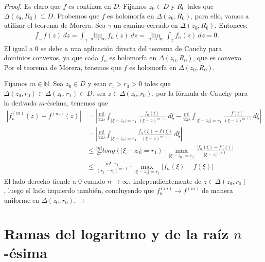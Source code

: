 \begin{proof}
    Es claro que $f$ es continua en $D$. Fijamos $z_0 \in D$ y $R_0$ tales que $\Delta(z_0,R_0) \subset D$. Probemos que $f$ es holomorfa en $\Delta(z_0,R_0)$, para ello, vamos a utilizar el teorema de Morera. Sea $\gamma$ un camino cerrado en $\Delta(z_0,R_0)$. Entonces:
    \begin{align*}
        \int_{\gamma} f(z) \ dz = \int_{\gamma} \lim_{n \to \infty} f_n(z) \ dz = \lim_{n \to \infty} \int_{\gamma} f_n(z) \ dz = 0.
    \end{align*}
    El igual a 0 se debe a una aplicación directa del teorema de Cauchy para dominios convexos, ya que cada $f_n$ es holomorfa en $\Delta(z_0,R_0)$, que es convexo. Por el teorema de Morera, tenemos que $f$ es holomorfa en $\Delta(z_0,R_0)$.

    Fijamos $m \in \mathbb{N}$. Sea $z_0 \in D$ y sean $r_1 > r_0 > 0$ tales que
    $\overline{\Delta(z_0,r_0)} \subset \overline{\Delta(z_0,r_1)} \subset D$. sea $z \in \Delta(z_0,r_0)$, por la fórmula de Cauchy para la derivada $m$-éseima, tenemos que
    \begin{align*}
        \left| f_n^{(m)}(z) - f^{(m)}(z) \right| & = \left| \frac{m!}{2\pi i}  \int_{|\xi - z_0| = r_1} \frac{f_n(\xi)}{(\xi - z)^{m+1}} \ d\xi - \frac{m!}{2\pi i} \int_{|\xi - z_0| = r_1} \frac{f(\xi)}{(\xi - z)^{m+1}} \ d\xi \right| \\
                                                 & = \left| \frac{m!}{2\pi i} \int_{|\xi - z_0| = r_1} \frac{f_n(\xi) - f(\xi)}{(\xi - z)^{m+1}} \ d\xi \right|                                                                            \\
                                                 & \leq \frac{m!}{2\pi} long(|\xi - z_0| = r_1) \cdot \max_{|\xi - z_0| = r_1} \frac{|f_n(\xi) - f(\xi)|}{|\xi - z|^{m+1}}                                                                 \\
                                                 & \leq \frac{m! \cdot r_1}{(r_1 - r_0)^{m+1}} \cdot \max_{|\xi - z_0| = r_1} |f_n(\xi) - f(\xi)|
    \end{align*}
    El lado derecho tiende a 0 cuando $n \to \infty$, independientemente de $z \in \overline{\Delta(z_0,r_0)}$, luego el lado izquierdo también, concluyendo que $f_n^{(m)} \to f^{(m)}$ de manera uniforme en $\overline{\Delta(z_0,r_0)}$.
\end{proof}

\section{Ramas del logaritmo y de la raíz $n$-ésima}

